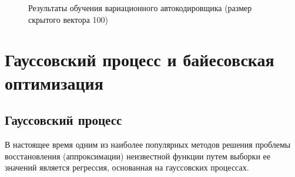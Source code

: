 \begin{figure}[H]
	\centering
	\caption{Результаты обучения вариационного автокодировщика (размер скрытого вектора 100)}
	\label{fig:res_autenc_100}
\end{figure}


\chapter{Гауссовский процесс и байесовская оптимизация}
\section{Гауссовский процесс}
В настоящее время одним из наиболее популярных методов решения проблемы восстановления (аппроксимации) неизвестной функции путем выборки ее значений является регрессия, основанная на гауссовских процессах.

